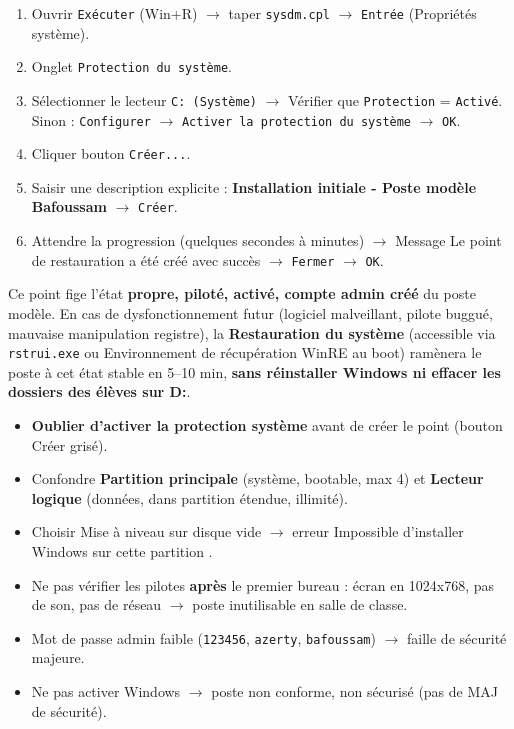 \documentclass[11pt]{article}
\begin{document}
\begin{methode}
\begin{enumerate}
  \item Ouvrir \texttt{Exécuter} (Win+R) $\rightarrow$ taper \texttt{sysdm.cpl} $\rightarrow$ \texttt{Entrée} (Propriétés système).
  \item Onglet \texttt{Protection du système}.
  \item Sélectionner le lecteur \texttt{C: (Système)} $\rightarrow$ Vérifier que \texttt{Protection} = \texttt{Activé}. Sinon : \texttt{Configurer} $\rightarrow$ \texttt{Activer la protection du système} $\rightarrow$ \texttt{OK}.
  \item Cliquer bouton \texttt{Créer...}.
  \item Saisir une description explicite : \og \textbf{Installation initiale - Poste modèle Bafoussam} \fg{} $\rightarrow$ \texttt{Créer}.
  \item Attendre la progression (quelques secondes à minutes) $\rightarrow$ Message \og Le point de restauration a été créé avec succès \fg{} $\rightarrow$ \texttt{Fermer} $\rightarrow$ \texttt{OK}.
\end{enumerate}
\end{methode}

\begin{exemplebox}
Ce point fige l'état \textbf{propre, piloté, activé, compte admin créé} du poste modèle. En cas de dysfonctionnement futur (logiciel malveillant, pilote buggué, mauvaise manipulation registre), la \textbf{Restauration du système} (accessible via \texttt{rstrui.exe} ou Environnement de récupération WinRE au boot) ramènera le poste à cet état stable en 5--10 min, \textbf{sans réinstaller Windows ni effacer les dossiers des élèves sur D:}.
\end{exemplebox}

\begin{attention}
\begin{itemize}
  \item \textbf{Oublier d'activer la protection système} avant de créer le point (bouton \og Créer \fg{} grisé).
  \item Confondre \textbf{Partition principale} (système, bootable, max 4) et \textbf{Lecteur logique} (données, dans partition étendue, illimité).
  \item Choisir \og Mise à niveau \fg{} sur disque vide $\rightarrow$ erreur \og Impossible d'installer Windows sur cette partition \fg{}.
  \item Ne pas vérifier les pilotes \textbf{après} le premier bureau : écran en 1024x768, pas de son, pas de réseau $\rightarrow$ poste inutilisable en salle de classe.
  \item Mot de passe admin faible (\texttt{123456}, \texttt{azerty}, \texttt{bafoussam}) $\rightarrow$ faille de sécurité majeure.
  \item Ne pas activer Windows $\rightarrow$ poste non conforme, non sécurisé (pas de MAJ de sécurité).
\end{itemize}
\end{attention}
\end{document}
